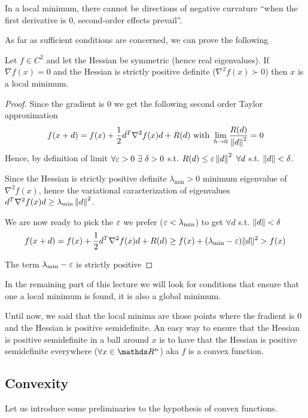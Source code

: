 \documentclass[computational_mathematics.tex]{subfiles}
\begin{document}
  In a local minimum, there cannot be directions of  negative curvature ``when the first derivative is $0$, second-order effects prevail''.

As far as sufficient conditions are concerned, we can prove the following

\begin{proposition}
  Let $f \in C^2$ and let the Hessian be symmetric (hence real eigenvalues).
  If $\nabla f(x) = 0$ and the Hessian is strictly positive definite ($\nabla^2 f(x) \succ 0$) then $x$ is a local minimum.
\end{proposition}

\begin{proof}
Since the gradient is $0$ we get the following second order Taylor approximation
\[
  f(x + d) = f(x) + \frac{1}{2} d^T \nabla^2 f(x) d + R(d)\mbox{ with } \lim\limits_{h \to 0} \frac{R(d)}{\left\lVert d\right\rVert^2} = 0
\]
  Hence, by definition of limit $\forall \varepsilon > 0~\exists~\delta > 0$ s.t. $R(d) \leq \varepsilon \left\lVert d\right\rVert^2~\forall d$ s.t. $\left\lVert d\right\rVert < \delta$.

Since the Hessian is strictly positive definite $\lambda_{\text{min}} > 0$ minimum eigenvalue of $\nabla^2 f(x)$, hence the variational caracterization of eigenvalues $d^T \nabla^2 f(x) d \geq \lambda_{\text{min}} \left\lVert d\right\rVert^2$.

  We are now ready to pick the $\varepsilon$ we prefer ($\varepsilon < \lambda_{\text{min}}$) to get $\forall d$ s.t. $\left\lVert d\right\rVert < \delta$
\[
  f(x + d) = f(x) + \frac{1}{2} d^T \nabla^2 f(x) d + R(d) \geq f(x) + (\lambda_{\text{min}} - \varepsilon)\|d\|^2 > f(x)
\]

  The term $\lambda_{\text{min}} - \varepsilon$ is strictly positive
\end{proof}

In the remaining part of this lecture we will look for conditions that ensure that one a local minimum is found, it is also a global minimum.

Until now, we said that the local minima are those points where the fradient is $0$ and the Hessian is positive semidefinite.
An easy way to ensure that the Hessian is positive semidefinite in a ball around $x$ is to have that the Hessian is positive semidefinite everywhere ($\forall x \in \R^n$) aka $f$ is a convex function.

\subsection{Convexity}
Let us introduce some preliminaries to the hypothesis of convex functions.
\end{document}
